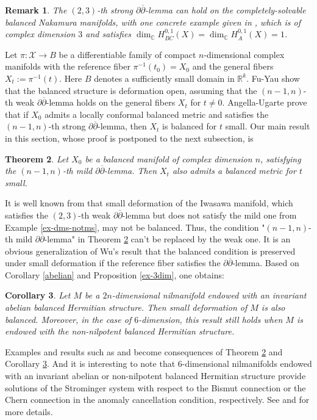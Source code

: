 \documentclass[12pt]{amsart}
\numberwithin{equation}{section}
\newtheorem{theorem} {Theorem} [section]
\newtheorem{corollary}  [theorem]     {Corollary}
\newtheorem{remark}  [theorem]     {Remark}
\renewcommand{\1}{\mathds{1}}
\newcommand{\db}{\overline{\partial}}
\renewcommand{\>}{\rightarrow}
\newcommand{\p}{\partial}
\def\p{\partial}
\def\mc{\mathcal}
\begin{document}
\begin{remark}
The $(2,3)$-th strong $\p\db$-lemma can hold on the
completely-solvable balanced Nakamura manifolds, with one concrete
example given in \cite[Example 4.10]{au}, which is of complex
dimension $3$ and satisfies $\dim_{\mathbb{C}} H^{0,1}_{BC}(X) =
\dim_{\mathbb{C}}H^{0,1}_{A}(X) =1$.
\end{remark}

Let $\pi:\mc{X}\to B$ be a differentiable family of compact
 $n$-dimensional complex manifolds  with the reference fiber
$\pi^{-1}(t_0)=X_0$ and the general fibers $X_t:=\pi^{-1}(t)$. Here
$B$ denotes a sufficiently small domain in $\mathbb{R}^k$. Fu-Yau \cite[Theorem 6]{FY} show that the balanced
structure is deformation open, assuming that the $(n-1,n)$-th weak
$\p\db$-lemma holds on the general fibers $X_t$ for $t \neq 0$.
Angella-Ugarte \cite[Theorem 4.9]{au} prove that if $X_0$ admits a
locally conformal balanced metric and satisfies the $(n-1,n)$-th
strong $\p\db$-lemma, then $X_t$ is balanced for $t$ small. Our main
result in this section, whose proof is postponed to the next
subsection, is
\begin{theorem}\label{blc-inv}
Let $X_0$ be a balanced manifold of complex dimension $n$,
satisfying the $(n-1,n)$-th mild $\p\db$-lemma. Then $X_t$ also
admits a balanced metric for $t$ small.
\end{theorem}

It is well known from \cite{ab} that small deformation of the
Iwasawa manifold, which satisfies the $(2,3)$-th weak $\p\db$-lemma
but does not satisfy the mild one from Example \ref{ex-dms-notms},
may not be balanced. Thus, the condition "$(n-1,n)$-th mild
$\p\db$-lemma" in Theorem \ref{blc-inv} can't be replaced by the
weak one. It is an obvious generalization of Wu's result \cite[Theorem 5.13]{w}
that the balanced condition is preserved under small deformation if
the reference  fiber satisfies the $\p\db$-lemma. Based on Corollary
\ref{abelian} and Proposition \ref{ex-3dim}, one obtains:
\begin{corollary}\label{abelian-inv}
Let $M$ be a $2n$-dimensional nilmanifold endowed with an invariant
abelian balanced Hermitian structure. Then small deformation of $M$
is also balanced. Moreover, in the case of $6$-dimension,
this result still holds when $M$ is endowed with the non-nilpotent
balanced Hermitian structure.
\end{corollary}

Examples and results such as \cite[Proposition 4.4, Remark 4.6,
Remark 4.7 and Example 4.10]{au} and \cite[Corollary 8 and Corollary
9]{FY} become consequences of Theorem \ref{blc-inv} and Corollary \ref{abelian-inv}. And it is
interesting to note that $6$-dimensional nilmanifolds endowed with
an invariant abelian or non-nilpotent balanced Hermitian structure
provide solutions of the Strominger system with respect to the
Bismut connection or the Chern connection in the anomaly
cancellation condition, respectively. See \cite[Section
5]{UV} and \cite[Section 4]{UV2} for more details.
\end{document}
